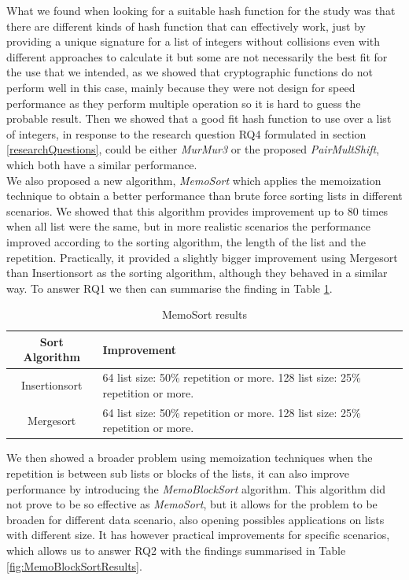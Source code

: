 \documentclass[a4paper,12pt]{article}
\begin{document}
What we found when looking for a suitable hash function for the study was that there are different kinds of hash function that can effectively work, just by providing a unique signature for a list of integers without collisions even with different approaches to calculate it but some are not necessarily the best fit for the use that we intended, as we showed that cryptographic functions do not perform well in this case, mainly because they were not design for speed performance as they perform multiple operation so it is hard to guess the probable result. Then we showed that a good fit hash function to use over a list of integers, in response to the research question RQ4 formulated in section \ref{researchQuestions}, could be either  {\it MurMur3}  or the proposed  {\it PairMultShift}, which both have a similar performance.\\

We also proposed a new algorithm, {\it MemoSort} which applies the memoization technique to obtain a better performance than brute force sorting lists in different scenarios. We showed that this algorithm provides improvement up to 80 times when all list were the same, but in more realistic scenarios the performance improved according to the sorting algorithm, the length of the list and the repetition. Practically, it provided a slightly bigger improvement using Mergesort than Insertionsort as the sorting algorithm, although they behaved in a similar way. To answer RQ1 we then can summarise the finding in Table \ref{fig:MemoSortResults}.

\begin{table}[H]
\centering
\begin{tabular}{|c|p{70mm}|}   \hline
	{Sort Algorithm} & {Improvement} \\  \hline
	Insertionsort & 64 list size: 50\% repetition or more. 128 list size: 25\% repetition or more.\\ 
	Mergesort & 64 list size: 50\% repetition or more. 128 list size: 25\% repetition or more. \\  \hline
\end{tabular}
\caption{MemoSort results}
\label{fig:MemoSortResults}
\end{table}


We then showed a broader problem using memoization techniques when the repetition is between sub lists or blocks of the lists, it can also improve performance by introducing the {\it MemoBlockSort} algorithm. This algorithm did not prove to be so effective as {\it MemoSort}, but it allows for the problem to be broaden for different data scenario, also opening possibles applications on lists with different size.  It has however practical improvements for specific scenarios, which allows us to answer RQ2 with the findings summarised in Table \ref{fig:MemoBlockSortResults}.
\end{document}
